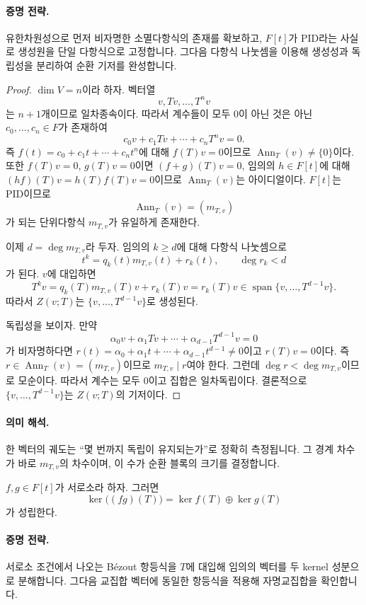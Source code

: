 \paragraph{증명 전략.}
유한차원성으로 먼저 비자명한 소멸다항식의 존재를 확보하고, $F[t]$가 PID라는 사실로 생성원을 단일 다항식으로 고정합니다. 그다음 다항식 나눗셈을 이용해 생성성과 독립성을 분리하여 순환 기저를 완성합니다.

\begin{proof}
$\dim V=n$이라 하자. 벡터열
\[
v,Tv,\dots,T^n v
\]
는 $n+1$개이므로 일차종속이다. 따라서 계수들이 모두 0이 아닌 것은 아닌 $c_0,\dots,c_n\in F$가 존재하여
\[
c_0v+c_1Tv+\cdots+c_nT^n v=0.
\]
즉 $f(t)=c_0+c_1t+\cdots+c_nt^n$에 대해 $f(T)v=0$이므로 $\operatorname{Ann}_T(v)\ne\{0\}$이다. 또한 $f(T)v=0$, $g(T)v=0$이면 $(f+g)(T)v=0$, 임의의 $h\in F[t]$에 대해 $(hf)(T)v=h(T)f(T)v=0$이므로 $\operatorname{Ann}_T(v)$는 아이디얼이다. $F[t]$는 PID이므로
\[
\operatorname{Ann}_T(v)=(m_{T,v})
\]
가 되는 단위다항식 $m_{T,v}$가 유일하게 존재한다.

이제 $d=\deg m_{T,v}$라 두자. 임의의 $k\ge d$에 대해 다항식 나눗셈으로
\[
t^k=q_k(t)m_{T,v}(t)+r_k(t),\qquad \deg r_k<d
\]
가 된다. $v$에 대입하면
\[
T^k v=q_k(T)m_{T,v}(T)v+r_k(T)v=r_k(T)v\in\operatorname{span}\{v,\dots,T^{d-1}v\}.
\]
따라서 $Z(v;T)$는 $\{v,\dots,T^{d-1}v\}$로 생성된다.

독립성을 보이자. 만약
\[
\alpha_0 v+\alpha_1 Tv+\cdots+\alpha_{d-1}T^{d-1}v=0
\]
가 비자명하다면 $r(t)=\alpha_0+\alpha_1 t+\cdots+\alpha_{d-1}t^{d-1}\ne0$이고 $r(T)v=0$이다. 즉 $r\in\operatorname{Ann}_T(v)=(m_{T,v})$이므로 $m_{T,v}\mid r$여야 한다. 그런데 $\deg r<\deg m_{T,v}$이므로 모순이다. 따라서 계수는 모두 0이고 집합은 일차독립이다. 결론적으로 $\{v,\dots,T^{d-1}v\}$는 $Z(v;T)$의 기저이다.
\end{proof}

\paragraph{의미 해석.}
한 벡터의 궤도는 ``몇 번까지 독립이 유지되는가''로 정확히 측정됩니다. 그 경계 차수가 바로 $m_{T,v}$의 차수이며, 이 수가 순환 블록의 크기를 결정합니다.

\begin{theorem}
$f,g\in F[t]$가 서로소라 하자. 그러면
\[
\ker\big((fg)(T)\big)=\ker f(T)\oplus\ker g(T)
\]
가 성립한다.
\end{theorem}

\paragraph{증명 전략.}
서로소 조건에서 나오는 Bézout 항등식을 $T$에 대입해 임의의 벡터를 두 kernel 성분으로 분해합니다. 그다음 교집합 벡터에 동일한 항등식을 적용해 자명교집합을 확인합니다.

